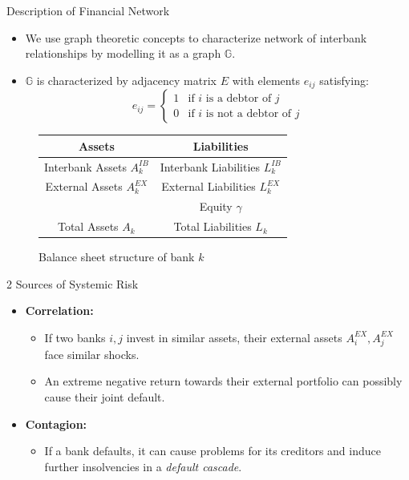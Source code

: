 \documentclass{beamer}
\begin{document}
\begin{frame}{Description of Financial Network}
\begin{itemize}
	\item We use graph theoretic concepts to characterize network of interbank relationships by modelling it as a graph $\mathbb{G}$.
	\item $\mathbb{G}$ is characterized by adjacency matrix $E$ with elements $e_{ij}$ satisfying:
	\begin{equation}
		\nonumber
		e_{ij}=\left\{ \begin{array}{cl}
			1 & \textrm{if $i$ is a debtor of $j$}\\
			0 & \textrm{if $i$ is not a debtor of $j$}
		\end{array}\right.
	\end{equation}
\end{itemize}
\begin{figure}[ht]
	\centering
	\begin{tabular}{c||c}
		Assets & Liabilities \\ 
		\hline Interbank Assets $A_k^{IB}$  & Interbank Liabilities $L_k^{IB}$ \\ 
		External Assets $A_k^{EX}$ & External Liabilities $L_k^{EX}$ \\ 
		& Equity $\gamma$ \\
		\hline
		Total Assets $A_k$ & Total Liabilities $L_k$\\
	\end{tabular} 
	\caption{Balance sheet structure of bank $k$}
	\label{fig:TheModel:BalanceSheet}
\end{figure}
\end{frame}

\begin{frame}{2 Sources of Systemic Risk}
\begin{itemize}
	\item \textbf{Correlation:}
	\begin{itemize}
		\item If two banks $i,j$ invest in similar assets, their external assets $A^{EX}_i,A^{EX}_j$ face similar shocks.
		\item An extreme negative return towards their external portfolio can possibly cause their joint default.
	\end{itemize}
	\item \textbf{Contagion:}
	\begin{itemize}
	\item If a bank defaults, it can cause problems for its creditors and induce further insolvencies in a \textit{default cascade}.
	\end{itemize}
\end{itemize}
\end{frame}
\end{document}
